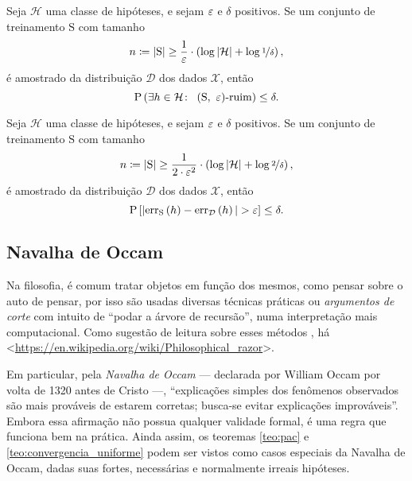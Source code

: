 \begin{teorema}
  \label{teo:pac}
  Seja $\mathcal{H}$ uma classe de hipóteses, e sejam $\varepsilon$ e $\delta$ positivos. Se um conjunto de treinamento $\mathrm{S}$ com tamanho
  \[
    n \coloneqq \left|\mathrm{S}\vphantom{1j}\right| \geq \frac{1}{\varepsilon}\cdot\left(\log\left|\mathcal{H}\vphantom{1j}\right| + \log\nicefrac{1}{\delta}\vphantom{1j}\right),
  \]
  é amostrado da distribuição $\mathcal{D}$ dos dados $\mathcal{X}$, então
  \[
    \mathrm{P}\left(\exists h\in\mathcal{H}\colon\ \left(\mathrm{S},\ \eps\vphantom{1j}\right)\!\text{-ruim}\vphantom{1j}\right) \leq \delta.
  \]
\end{teorema}

\begin{teorema}
  \label{teo:convergencia_uniforme}
  Seja $\mathcal{H}$ uma classe de hipóteses, e sejam $\varepsilon$ e $\delta$ positivos. Se um conjunto de treinamento $\mathrm{S}$ com tamanho
  \[
    n \coloneqq \left|\mathrm{S}\vphantom{1j}\right| \geq \frac{1}{2\cdot\varepsilon^2}\cdot\left(\log\left|\mathcal{H}\vphantom{1j}\right| + \log\nicefrac{2}{\delta}\vphantom{1j}\right),
  \]
  é amostrado da distribuição $\mathcal{D}$ dos dados $\mathcal{X}$, então
  \[
    \mathrm{P}\left[\left|\mathrm{err}_\mathrm{S}\left(h\vphantom{1j}\right)-\mathrm{err}_\mathcal{D}\left(h\vphantom{1j}\right)\vphantom{1j}\right| > \varepsilon\vphantom{1j}\right] \leq \delta.
  \]
\end{teorema}

\subsection{Navalha de Occam}

Na filosofia, é comum tratar objetos em função dos mesmos, como pensar sobre o auto de pensar, por isso são usadas diversas técnicas práticas ou \textit{argumentos de corte} com intuito de ``podar a árvore de recursão'', numa interpretação mais computacional. Como sugestão de leitura sobre esses métodos , há <\href{https://en.wikipedia.org/wiki/Philosophical\_razor}{https://en.wikipedia.org/wiki/Philosophical\_razor}>.

Em particular, pela \textit{Navalha de Occam} --- declarada por William Occam por volta de 1320 antes de Cristo ---, ``explicações simples dos fenômenos observados são mais prováveis de estarem corretas; busca-se evitar explicações improváveis''. Embora essa afirmação não possua qualquer validade formal, é uma regra que funciona bem na prática. Ainda assim, os teoremas \autoref{teo:pac} e \autoref{teo:convergencia_uniforme} podem ser vistos como casos especiais da Navalha de Occam, dadas suas fortes, necessárias e normalmente irreais hipóteses.


